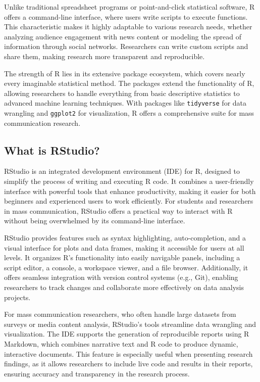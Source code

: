 \documentclass[
]{book}
\begin{document}
Unlike traditional spreadsheet programs or point-and-click statistical software, R offers a command-line interface, where users write scripts to execute functions. This characteristic makes it highly adaptable to various research needs, whether analyzing audience engagement with news content or modeling the spread of information through social networks. Researchers can write custom scripts and share them, making research more transparent and reproducible.

The strength of R lies in its extensive package ecosystem, which covers nearly every imaginable statistical method. The packages extend the functionality of R, allowing researchers to handle everything from basic descriptive statistics to advanced machine learning techniques. With packages like \texttt{tidyverse} for data wrangling and \texttt{ggplot2} for visualization, R offers a comprehensive suite for mass communication research.

\subsection*{What is RStudio?}\label{what-is-rstudio}

RStudio is an integrated development environment (IDE) for R, designed to simplify the process of writing and executing R code. It combines a user-friendly interface with powerful tools that enhance productivity, making it easier for both beginners and experienced users to work efficiently. For students and researchers in mass communication, RStudio offers a practical way to interact with R without being overwhelmed by its command-line interface.

RStudio provides features such as syntax highlighting, auto-completion, and a visual interface for plots and data frames, making it accessible for users at all levels. It organizes R's functionality into easily navigable panels, including a script editor, a console, a workspace viewer, and a file browser. Additionally, it offers seamless integration with version control systems (e.g., Git), enabling researchers to track changes and collaborate more effectively on data analysis projects.

For mass communication researchers, who often handle large datasets from surveys or media content analysis, RStudio's tools streamline data wrangling and visualization. The IDE supports the generation of reproducible reports using R Markdown, which combines narrative text and R code to produce dynamic, interactive documents. This feature is especially useful when presenting research findings, as it allows researchers to include live code and results in their reports, ensuring accuracy and transparency in the research process.
\end{document}
